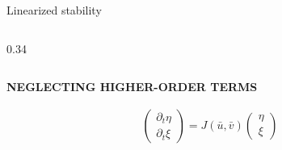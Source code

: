 \begin{frame}{Linearized stability}
\begin{columns}[T,onlytextwidth]
\begin{column}{0.34\textwidth}
    \end{column}

  \end{columns}

  \vspace{-0.12cm}

  {\color{HydraGold}\bfseries\fontsize{7.7}{9.2}\selectfont
    NEGLECTING HIGHER-ORDER TERMS\par}

  \vspace{-0.32cm}

  {\color{HydraWhite}\bfseries\fontsize{12.8}{16}\selectfont
  \begin{align*}
    \boxed{
      \begin{pmatrix}
        \partial_t \eta
        \\
        \partial_t \xi
      \end{pmatrix}
      =
      J(\bar u,\bar v)
      \begin{pmatrix}
        \eta
        \\
        \xi
      \end{pmatrix}
    }
  \end{align*}
  }

  \vspace{-0.30cm}


\end{frame}


